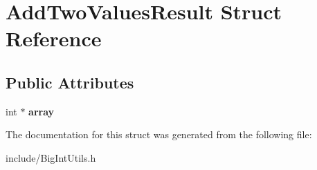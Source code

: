 \section{Add\+Two\+Values\+Result Struct Reference}
\label{struct_add_two_values_result}
\subsection*{Public Attributes}
\begin{DoxyCompactItemize}
\item 
\mbox{\label{struct_add_two_values_result_ad5f173a76df5cfda233ac1e04701062c}} 
int $\ast$ {\bfseries array}
\end{DoxyCompactItemize}


The documentation for this struct was generated from the following file\+:\begin{DoxyCompactItemize}
\item 
include/Big\+Int\+Utils.\+h\end{DoxyCompactItemize}
